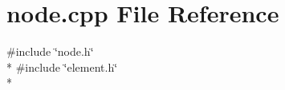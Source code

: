 \section{node.\-cpp File Reference}
\label{node_8cpp}
{\ttfamily \#include \char`\"{}node.\-h\char`\"{}}\\*
{\ttfamily \#include \char`\"{}element.\-h\char`\"{}}\\*
